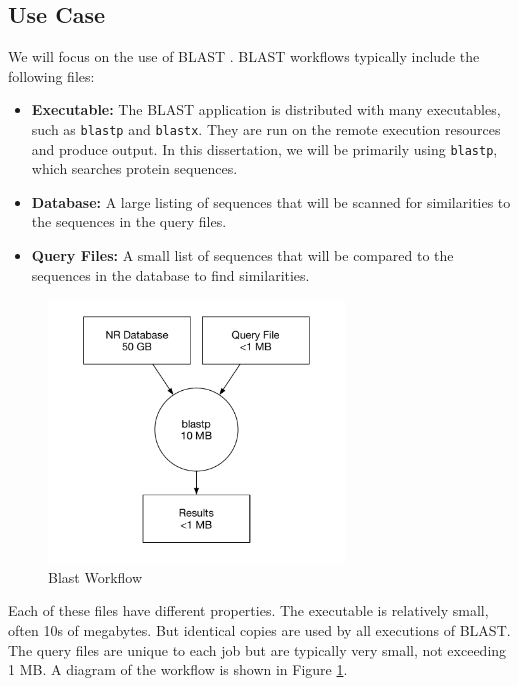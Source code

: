 \subsection{Use Case}
We will focus on the use of BLAST \cite{altschul1990basic}.  BLAST workflows typically include the following files:

\begin{itemize}
	\item \textbf{Executable:} The BLAST application is distributed with many executables, such as \texttt{blastp} and \texttt{blastx}.  They are run on the remote execution resources and produce output.  In this dissertation, we will be primarily using \texttt{blastp}, which searches protein sequences.
	\item \textbf{Database:}  A large listing of sequences that will be scanned for similarities to the sequences in the query files.
	\item \textbf{Query Files:} A small list of sequences that will be compared to the sequences in the database to find similarities.  
\end{itemize}

\begin{figure}
	\centering
	\includegraphics[width=0.7\textwidth]{images/BlastWorkflow}
	\caption{Blast Workflow}
	\label{fig:blastworkflow}
\end{figure}

Each of these files have different properties.  The executable is relatively small, often 10s of megabytes.  But identical copies are used by all executions of BLAST.  The query files are unique to each job but are typically very small, not exceeding 1 MB.  A diagram of the workflow is shown in Figure \ref{fig:blastworkflow}.

